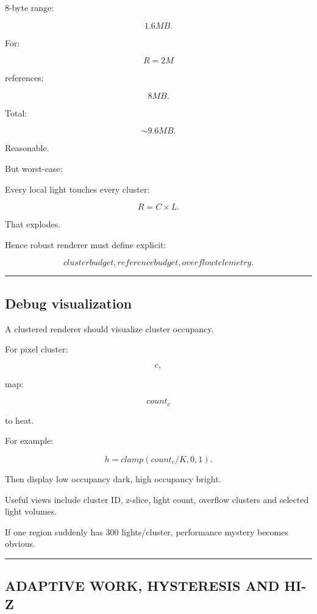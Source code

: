 8-byte range:

\[
1.6MB.
\]

For:

\[
R=2M
\]

references:

\[
8MB.
\]

Total:

\[
\sim9.6MB.
\]

Reasonable.

But worst-case:

Every local light touches every cluster:

\[
R=C\times L.
\]

That explodes.

Hence robust renderer must define explicit:

\[
\boxed{
cluster budget,
reference budget,
overflow telemetry.
}
\]

\begin{center}\rule{0.5\linewidth}{0.5pt}\end{center}

\subsection{Debug visualization}\label{04-visual-computing-ii-ch040-debug-visualization}

\hypertarget{04-visual-computing-ii-ch040-debug-visualization}{}

A clustered renderer should visualize cluster occupancy.

For pixel cluster:

\[
c,
\]

map:

\[
count_c
\]

to heat.

For example:

\[
h=
clamp(
count_c/K,
0,1
).
\]

Then display low occupancy dark, high occupancy bright.

Useful views include cluster ID, z-slice, light count, overflow clusters and selected light volumes.

If one region suddenly has 300 lights/cluster, performance mystery becomes obvious.

\begin{center}\rule{0.5\linewidth}{0.5pt}\end{center}

\subsection{ADAPTIVE WORK, HYSTERESIS AND HI-Z}\label{04-visual-computing-ii-ch040-adaptive-work-hysteresis-and-hi-z}

